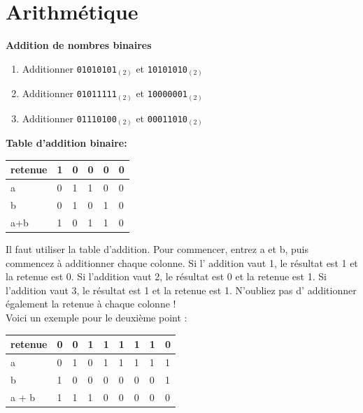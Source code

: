 \section{Arithmétique}

\begin{Exercice}[15 minutes] \textbf{Addition de nombres binaires}
    \begin{enumerate}
        \item Additionner \lstinline{01010101}$_{(2)}$ et \lstinline{10101010}$_{(2)}$
        \item Additionner \lstinline{01011111}$_{(2)}$ et \lstinline{10000001}$_{(2)}$
        \item Additionner \lstinline{01110100}$_{(2)}$ et \lstinline{00011010}$_{(2)}$
    \end{enumerate}
    \begin{conseil}
\textbf{Table d'addition binaire:}\\
\begin{tabular}{| C{0.1\textwidth} | C{0.1\textwidth} | C{0.1\textwidth} | C{0.1\textwidth} | C{0.1\textwidth} | C{0.1\textwidth} |} 
    \hline
    retenue & 1 & 0 & 0 & 0 & 0 \\ [0.5ex] 
    \hline
    a & 0 & 1 & 1 & 0 & 0 \\ [0.5ex] 
    \hline
    b & 0 & 1 & 0 & 1 & 0 \\ [0.5ex] 
    \hline
    a+b & 1 & 0 & 1 & 1 & 0 \\ [0.5ex] 
    \hline
\end{tabular}
    \end{conseil}
    \begin{solution}
        Il faut utiliser la table d'addition. Pour commencer, entrez a et b, puis commencez à additionner chaque colonne. Si l' addition vaut 1, le résultat est 1 et la retenue est 0. Si l'addition vaut 2, le résultat est 0 et la retenue est 1. Si l'addition vaut 3, le résultat est 1 et la retenue est 1. N'oubliez pas d' additionner également la retenue à chaque colonne ! \\
        
        Voici un exemple pour le deuxième point : \\
        \begin{tabular}{| p{1cm} | p{1cm} | p{1cm} | p{1cm} | p{1cm} | p{1cm} | p{1cm} | p{1cm} | p{1cm} |} 
            \hline
	    retenue & 0 & 0 & 1 & 1 & 1 & 1 & 1 & 0 \\ [0.5ex]
	    \hline
            a & 0 & 1 & 0 & 1 & 1 & 1 & 1 & 1 \\ [0.5ex] 
            \hline
            b & 1 & 0 & 0 & 0 & 0 & 0 & 0 & 1 \\ [0.5ex] 
            \hline
            a + b & 1 & 1 & 1 & 0 & 0 & 0 & 0 & 0 \\ [0.5ex]
            \hline
        \end{tabular} \\


\end{solution}
\end{Exercice}
